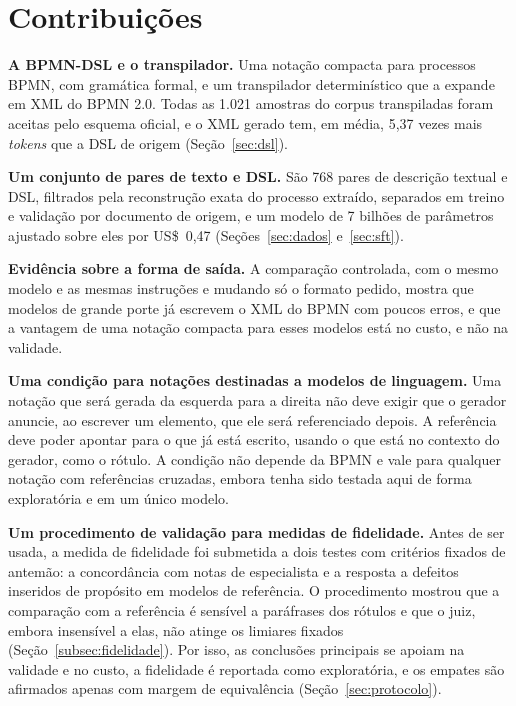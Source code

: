 \section{Contribuições}\label{sec:contribuicoes}

\textbf{A BPMN-DSL e o transpilador.} Uma notação compacta para processos BPMN, com gramática formal, e um transpilador determinístico que a expande em XML do BPMN 2.0. Todas as 1.021 amostras do corpus transpiladas foram aceitas pelo esquema oficial, e o XML gerado tem, em média, 5,37 vezes mais \textit{tokens} que a DSL de origem (Seção~\ref{sec:dsl}).

\textbf{Um conjunto de pares de texto e DSL.} São 768 pares de descrição textual e DSL, filtrados pela reconstrução exata do processo extraído, separados em treino e validação por documento de origem, e um modelo de 7 bilhões de parâmetros ajustado sobre eles por US\$~0,47 (Seções~\ref{sec:dados} e~\ref{sec:sft}).

\textbf{Evidência sobre a forma de saída.} A comparação controlada, com o mesmo modelo e as mesmas instruções e mudando só o formato pedido, mostra que modelos de grande porte já escrevem o XML do BPMN com poucos erros, e que a vantagem de uma notação compacta para esses modelos está no custo, e não na validade.

\textbf{Uma condição para notações destinadas a modelos de linguagem.} Uma notação que será gerada da esquerda para a direita não deve exigir que o gerador anuncie, ao escrever um elemento, que ele será referenciado depois. A referência deve poder apontar para o que já está escrito, usando o que está no contexto do gerador, como o rótulo. A condição não depende da BPMN e vale para qualquer notação com referências cruzadas, embora tenha sido testada aqui de forma exploratória e em um único modelo.

\textbf{Um procedimento de validação para medidas de fidelidade.} Antes de ser usada, a medida de fidelidade foi submetida a dois testes com critérios fixados de antemão: a concordância com notas de especialista e a resposta a defeitos inseridos de propósito em modelos de referência. O procedimento mostrou que a comparação com a referência é sensível a paráfrases dos rótulos e que o juiz, embora insensível a elas, não atinge os limiares fixados (Seção~\ref{subsec:fidelidade}). Por isso, as conclusões principais se apoiam na validade e no custo, a fidelidade é reportada como exploratória, e os empates são afirmados apenas com margem de equivalência (Seção~\ref{sec:protocolo}).

